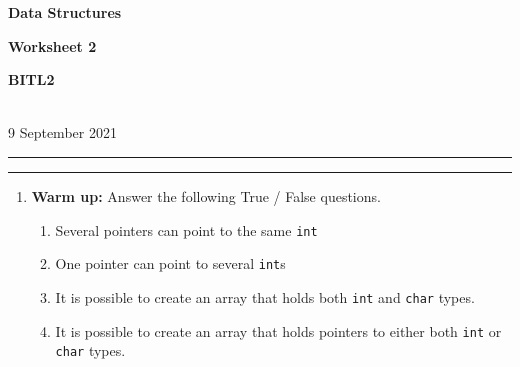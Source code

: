 \documentclass[a4paper,12pt]{article}
\begin{document}
\begin{center}
\parbox{3.5cm}{\textbf{Data Structures}} \hfill {\bf\Huge Worksheet 2} \hfill \parbox{3.5cm}{\flushright\textbf{BITL2}} \\[5pt]
\rm\small 9 September 2021
\end{center}

\hrule\vspace{2pt}\hrule

\begin{enumerate}

\item \textbf{Warm up:} Answer the following True / False questions.
\begin{enumerate}
\item Several pointers can point to the same \texttt{int}
\item One pointer can point to several \texttt{int}s
\item It is possible to create an array that holds both \texttt{int} and \texttt{char} types.  
\item It is possible to create an array that holds pointers to either both \texttt{int} or \texttt{char} types. 
\end{enumerate}
\end{enumerate}
\end{document}
